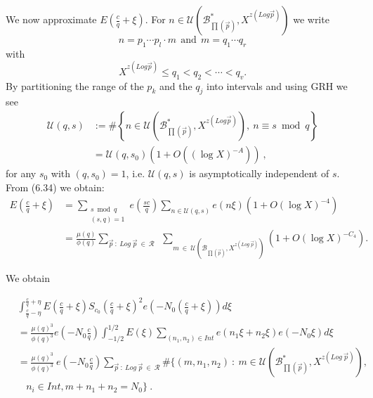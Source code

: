 \documentclass{amsart}
\numberwithin{equation}{subsection}
\begin{document}
We now approximate $E\left(\frac{c}{q}+\xi\right)$. For $n\in \mathcal{U}\left( \mathcal{B}^*_{\prod(\vec{p})}, X^{z(Log \vec{p})}\right)$ we write
$$n=p_1\cdots p_l\cdot m\ \ \text{and}\ \ m=q_1\cdots q_r$$
with
$$X^{z(Log \vec{p})} \leq q_1< q_2<\cdots <q_v.$$
By partitioning the range of the $p_k$  and the $q_j$ into intervals and using GRH we see
\begin{align*}
\mathcal{U}(q, s)&:=\# \left\{ n\in \mathcal{U}\left( \mathcal{B}^*_{\prod(\vec{p})}, X^{z(Log \vec{p})}\right),\ n\equiv s \bmod q\right\}  \tag{6.34}\\
&=\mathcal{U}(q, s_0)\left(1+O((\log X)^{-A})\right)\:,
\end{align*}
for any $s_0$ with $(q, s_0)=1$, i.e. $\mathcal{U}(q, s)$ is asymptotically independent of $s$.\\
From (6.34) we obtain:
\begin{align*}
E\left(\frac{c}{q}+\xi\right)&=\sum_{\substack{s \bmod q \\ (s, q)=1}} e\left(\frac{sc}{q}\right) \sum_{n\in \mathcal{U}(q, s)} e(n\xi)(1+O(\log X)^{-4})\\
&=\frac{\mu(q)}{\phi(q)} \sum_{\vec{p}\::\: Log\: \vec{p}\:\in\: \mathcal{R}}\ \  \sum_{m\:\in\: \mathcal{U}(\mathcal{B}_{\prod(\vec{p})}, X^{z(Log\: \vec{p})})}  (1+O(\log X)^{-C_4}).
\end{align*}

We obtain

\begin{align*}
&\int_{\frac{c}{q}-\eta}^{\frac{c}{q}+\eta} E\left(\frac{c}{q}+\xi\right) S_{c_0}\left(\frac{c}{q}+\xi\right)^2 e\left(-N_0\left(\frac{c}{q}+\xi\right)\right) d\xi  \tag{6.35}\\
&=\frac{\mu(q)^3}{\phi(q)^3} e\left(-N_0\frac{c}{q}\right) \int_{-1/2}^{1/2} E(\xi)\sum_{(n_1, n_2)\in Int} e(n_1\xi+n_2\xi) e(-N_0\xi) d\xi\\
&=\frac{\mu(q)^3}{\phi(q)^3}\ e\left(-N_0\frac{c}{q}\right) \sum_{\vec{p}\::\: Log\: \vec{p}\:\in\: \mathcal{R}} \#\Big\{(m, n_1, n_2)\::\: m\in \mathcal{U}\left( \mathcal{B}^*_{\prod(\vec{p})}, X^{z(Log\: \vec{p})}\right),\\
&\ \ \ \  n_i\in Int, m+n_1+n_2=N_0\Big\}\:.
\end{align*}
\end{document}
